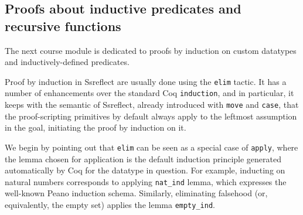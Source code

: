 \documentclass[blockstyle,preprint,nocopyrightspace]{sigplanconf}
\newcommand{\is}[1]{\textcolor{blue}{(Ilya: {#1})}}
\newcommand{\an}[1]{\textcolor{red}{(Aleks: {#1})}}
\newcommand{\code}[1]{\lstinline{#1}}
\begin{document}
\subsection{Proofs about inductive predicates and recursive functions}
\label{sec:induction}
The next course module is dedicated to proofs by induction on custom
datatypes and inductively-defined predicates.

Proof by induction in Ssreflect are usually done using the \code{elim}
tactic. It has a number of enhancements over the standard Coq
\code{induction}, and in particular, it keeps with the semantic of
Ssreflect, already introduced with \code{move} and \code{case}, that
the proof-scripting primitives by default always apply to the leftmost
assumption in the goal, initiating the proof by induction on it.
%
%

We begin by pointing out that \code{elim} can be seen as a special
case of \code{apply}, where the lemma chosen for application is the
default induction principle generated automatically by Coq for the
datatype in question. For example, inducting on natural numbers
corresponds to applying \code{nat_ind} lemma, which expresses the
well-known Peano induction schema. Similarly, eliminating falsehood
(or, equivalently, the empty set) applies the lemma \code{empty_ind}.
%
%
\end{document}

